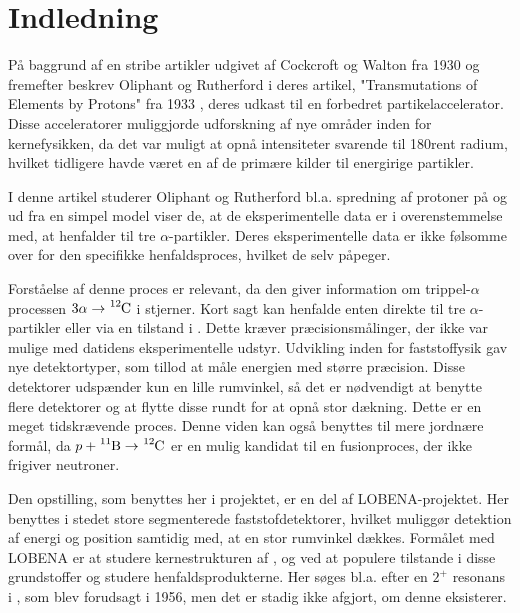 \chapter{Indledning}
\label{cha:indledning}
\vspace{-0.5\onelineskip}

På baggrund af en stribe artikler udgivet af Cockcroft og Walton fra 1930 og fremefter \cite{Walton}
beskrev Oliphant og Rutherford i deres artikel, "Transmutations of Elements by Protons"{} fra 1933
\cite{Rutherford}, deres udkast til en forbedret partikelaccelerator. Disse acceleratorer muliggjorde
udforskning af nye områder inden for kernefysikken, da det var muligt at opnå intensiteter svarende
til 180\gram rent radium, hvilket tidligere havde været en af de primære kilder til energirige
partikler.

I denne artikel studerer Oliphant og Rutherford bl.a. spredning af protoner på \Bor og ud fra en
simpel model viser de, at de eksperimentelle data er i overenstemmelse med, at \Carb henfalder til
tre $\alpha$-partikler. Deres eksperimentelle data er ikke følsomme over for den specifikke
henfaldsproces, hvilket de selv påpeger. 

Forståelse af denne proces er relevant, da den giver information om trippel-$\alpha$ processen
$3\alpha\rightarrow\Carb$ i stjerner. Kort sagt kan \Carb henfalde enten direkte til tre $\alpha$-partikler
eller via en tilstand i \Be. Dette kræver præcisionsmålinger, der ikke var mulige med datidens
eksperimentelle udstyr. Udvikling inden for faststoffysik gav nye detektortyper, som tillod at måle
energien med større præcision. Disse detektorer udspænder kun en lille rumvinkel, så det er
nødvendigt at benytte flere detektorer og at flytte disse rundt for at opnå stor dækning. Dette er en
meget tidskrævende proces. Denne viden kan også benyttes til mere jordnære formål, da $p+\Bor
\rightarrow \Carb$ er en mulig kandidat til en fusionproces, der ikke frigiver neutroner. 

Den opstilling, som benyttes her i projektet, er en del af LOBENA-projektet. Her benyttes i stedet
store segmenterede faststofdetektorer, hvilket muliggør detektion af energi og position samtidig med,
at en stor rumvinkel dækkes. Formålet med LOBENA er at studere kernestrukturen af \Be, \Carb og
 ved at populere tilstande i disse grundstoffer og studere henfaldsprodukterne. Her søges
bl.a. efter en $2^{+}$ resonans i \Carb, som blev forudsagt i 1956, men det er stadig ikke afgjort,
om denne eksisterer.

